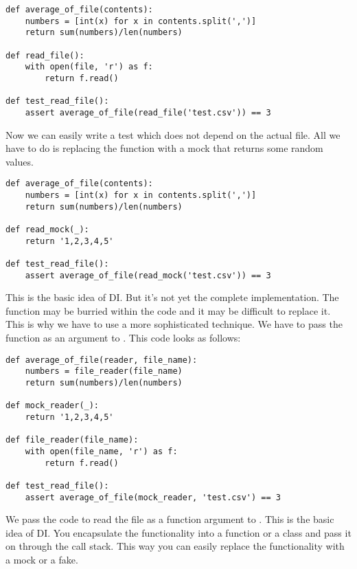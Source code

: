 \begin{programcode}{}
\begin{verbatim}
def average_of_file(contents):
    numbers = [int(x) for x in contents.split(',')]
    return sum(numbers)/len(numbers)

def read_file():
    with open(file, 'r') as f:
        return f.read()

def test_read_file():
    assert average_of_file(read_file('test.csv')) == 3
\end{verbatim}
\end{programcode}

Now we can easily write a test which does not depend on the actual file. All we have to do is replacing the  function with a mock that returns some random values.

\begin{programcode}{}
\begin{verbatim}
def average_of_file(contents):
    numbers = [int(x) for x in contents.split(',')]
    return sum(numbers)/len(numbers)

def read_mock(_):
    return '1,2,3,4,5'

def test_read_file():
    assert average_of_file(read_mock('test.csv')) == 3
\end{verbatim}
\end{programcode}

This is the basic idea of DI. But it's not yet the complete implementation. The  function may be burried within the code and it may be difficult to replace it. This is why we have to use a more sophisticated technique. We have to pass the function as an argument to . This code looks as follows:

\begin{programcode}{}
\begin{verbatim}
def average_of_file(reader, file_name):
    numbers = file_reader(file_name)
    return sum(numbers)/len(numbers)

def mock_reader(_):
    return '1,2,3,4,5'

def file_reader(file_name):
    with open(file_name, 'r') as f:
        return f.read()

def test_read_file():
    assert average_of_file(mock_reader, 'test.csv') == 3
\end{verbatim}
\end{programcode}

We pass the code to read the file as a function argument to . This is the basic idea of DI. You encapsulate the functionality into a function or a class and pass it on through the call stack. This way you can easily replace the functionality with a mock or a fake.

